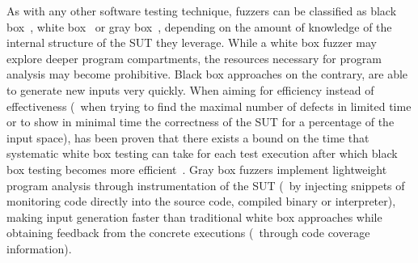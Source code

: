 As with any other software testing technique, fuzzers can be classified as black
box~\cite{hocevar2011zzuf, helin2015radamsa, householder2012probability,
woo2013scheduling}, white box~\cite{godefroid2012sage, stephens2016driller} or
gray box~\cite{bohme2017coverage, bohme2017directed, afl}, depending on the
amount of knowledge of the internal structure of the \ac{SUT} they leverage.
While a white box fuzzer may explore deeper program compartments, the resources
necessary for program analysis may become prohibitive. Black box approaches on
the contrary, are able to generate new inputs very quickly. When aiming for
efficiency instead of effectiveness (\eg~when trying to find the maximal number
of defects in limited time or to show in minimal time the correctness of the
\ac{SUT} for a percentage of the input space), has been proven that there exists
a bound on the time that systematic white box testing can take for each test
execution after which black box testing becomes more
efficient~\cite{bohme2016probabilistic}. Gray box fuzzers implement lightweight
program analysis through instrumentation of the \ac{SUT} (\eg~by injecting
snippets of monitoring code directly into the source code, compiled binary or
interpreter), making input generation faster than traditional white box
approaches while obtaining feedback from the concrete executions (\eg~through
code coverage information).





